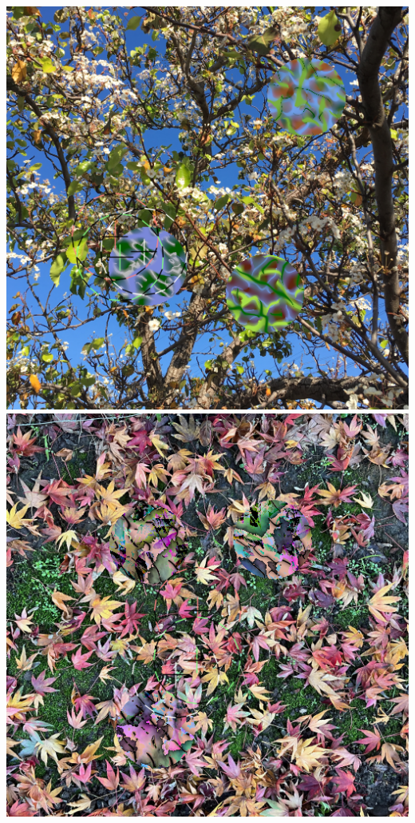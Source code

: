 \documentclass[sigconf]{acmart}
\begin{document}
\begin{teaserfigure}
    \includegraphics[scale=0.24]{images/20220926_step_6143.png}
    \hfill
    \includegraphics[scale=0.24]{images/20220918_step_7372.png}

\end{teaserfigure}
\end{document}
